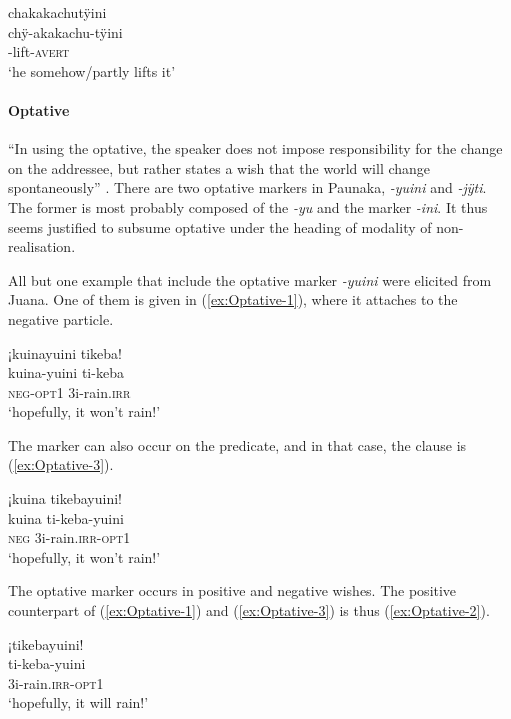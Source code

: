 \ea\label{ex:AVERT-3}
\begingl
\glpreamble chakakachutÿini\\
\gla chÿ-akakachu-tÿini\\
-lift-\textsc{avert}\\
\glft ‘he somehow/partly lifts it’
\endgl
\trailingcitation{[mtx-a110906l.065]}
\xe
{}

\paragraph{Optative}\label{sec:FRUST-Optative}

“In using the optative, the speaker does not impose responsibility for the change on the addressee, but rather states a wish that the world will change spontaneously” \citep[319]{Timberlake2007}. There are two optative markers in Paunaka, \textit{-yuini} and \textit{-jÿti}. The former is most probably composed of the  \textit{-yu} and the  marker \textit{-ini}. It thus seems justified to subsume optative under the heading of modality of non-realisation. 

All but one example that include the optative marker \textit{-yuini} were elicited from Juana. One of them is given in (\ref{ex:Optative-1}), where it attaches to the negative particle.

\ea\label{ex:Optative-1}
\begingl 
\glpreamble ¡kuinayuini tikeba!\\
\gla kuina-yuini ti-keba\\ 
\glb \textsc{neg}-\textsc{opt}1 3i-rain.\textsc{irr}\\ 
\glft ‘hopefully, it won’t rain!’
\trailingcitation{[jxx-e110923l-2.055]}
\xe

The marker can also occur on the predicate, and in that case, the clause is (\ref{ex:Optative-3}).

\ea\label{ex:Optative-3}
\begingl
\glpreamble ¡kuina tikebayuini!\\
\gla kuina ti-keba-yuini\\
\glb \textsc{neg} 3i-rain.\textsc{irr}-\textsc{opt}1\\
\glft ‘hopefully, it won’t rain!’
\endgl
\trailingcitation{[jxx-e181101l-1]}
\xe

The optative marker occurs in positive and negative wishes. The positive counterpart of (\ref{ex:Optative-1}) and (\ref{ex:Optative-3}) is thus (\ref{ex:Optative-2}). 

\ea\label{ex:Optative-2}
\begingl 
\glpreamble ¡tikebayuini!\\
\gla ti-keba-yuini\\ 
\glb 3i-rain.\textsc{irr}-\textsc{opt}1\\ 
\glft ‘hopefully, it will rain!’
\trailingcitation{[jxx-p150920l.034]}
\xe

